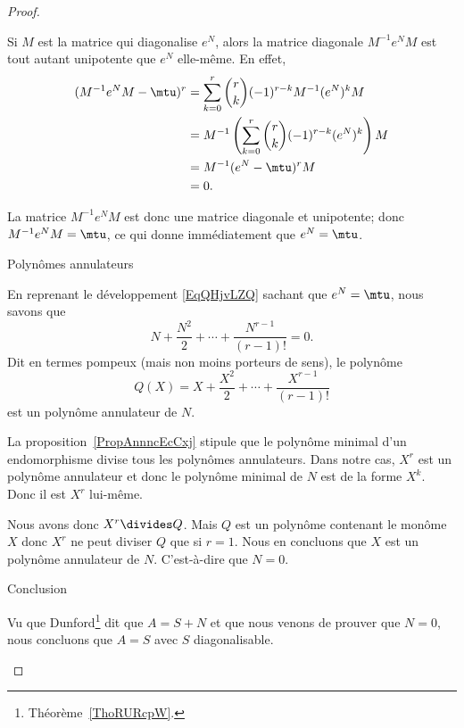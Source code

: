 \begin{proof}
\begin{subproof}
            Si \( M\) est la matrice qui diagonalise \( e^N\), alors la matrice diagonale \( M^{-1}e^NM\) est tout autant unipotente que \( e^N\) elle-même. En effet,
            \begin{subequations}
                \begin{align}
                    (M^{-1}e^NM-\mtu)^r&=\sum_{k=0}^r\binom{ r }{ k }(-1)^{r-k}M^{-1}(e^N)^kM\\
                    &=M^{-1}\left( \sum_{k=0}^r\binom{ r }{ k }(-1)^{r-k}(e^N)^k \right)M\\
                    &=M^{-1}(e^N-\mtu)^rM\\
                    &=0.
                \end{align}
            \end{subequations}

            La matrice \( M^{-1}e^NM\) est donc une matrice diagonale et unipotente; donc \( M^{-1}e^NM=\mtu\), ce qui donne immédiatement que \( e^N=\mtu\).

        \item[Polynômes annulateurs]

            En reprenant le développement \eqref{EqQHjvLZQ} sachant que \( e^N=\mtu\), nous savons que
            \begin{equation}
                N+\frac{ N^2 }{2}+\cdots +\frac{ N^{r-1} }{ (r-1)! }=0.
            \end{equation}
            Dit en termes pompeux (mais non moins porteurs de sens), le polynôme
            \begin{equation}
                Q(X)=X+\frac{ X^2 }{2}+\cdots +\frac{ X^{r-1} }{ (r-1)! }
            \end{equation}
            est un polynôme annulateur de \( N\).

            La proposition~\ref{PropAnnncEcCxj} stipule que le polynôme minimal d'un endomorphisme divise tous les polynômes annulateurs. Dans notre cas, \( X^r\) est un polynôme annulateur et donc le polynôme minimal de \( N\) est de la forme \( X^k\). Donc il est \( X^r\) lui-même.

            Nous avons donc \( X^r\divides Q\). Mais \( Q\) est un polynôme contenant le monôme \( X\) donc \( X^r\) ne peut diviser \( Q\) que si \( r=1\). Nous en concluons que \( X\) est un polynôme annulateur de \( N\). C'est-à-dire que \( N=0\).

        \item[Conclusion]

            Vu que Dunford\footnote{Théorème~\ref{ThoRURcpW}.} dit que \( A=S+N\) et que nous venons de prouver que \( N=0\), nous concluons que \( A=S\) avec \( S\) diagonalisable.

    \end{subproof}
\end{proof}

